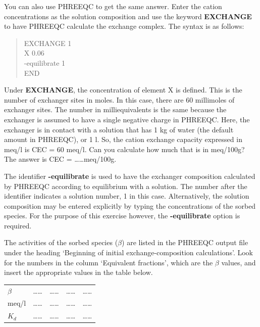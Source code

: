 You can also use PHREEQC to get the same answer. Enter the cation concentrations as the solution composition and use the keyword \textbf{EXCHANGE} to have PHREEQC calculate the exchange complex. The syntax is as follows:

\begin{quote}
EXCHANGE 1 \\
	X 0.06 \\
	-equilibrate 1 \\
END
\end{quote}

Under \textbf{EXCHANGE}, the concentration of element X is defined. This is the number of exchanger sites in moles. In this case, there are 60 millimoles of exchanger sites. The number in milliequivalents is the same because the exchanger is assumed to have a single negative charge in PHREEQC. Here, the exchanger is in contact with a solution that has 1 kg of water (the default amount in PHREEQC), or 1 l. So, the cation exchange capacity expressed in meq/l is CEC = 60 meq/l. Can you calculate how much that is in meq/100g? The answer is CEC = \ldots\ldots meq/100g.

The identifier \textbf{-equilibrate} is used to have the exchanger composition calculated by PHREEQC according to equilibrium with a solution. The number after the identifier indicates a solution number, 1 in this case. Alternatively, the solution composition may be entered explicitly by typing the concentrations of the sorbed species. For the purpose of this exercise however, the \textbf{-equilibrate} option is required.

The activities of the sorbed species ($\beta$) are listed in the PHREEQC output file under the heading `Beginning of initial exchange-composition calculations'. Look for the numbers in the column `Equivalent fractions', which are the $\beta$ values, and insert the appropriate values in the table below.

\begin{table}[hb]
\centering
\footnotesize
\begin{tabular}{lllll}
\toprule
 & \na	& \ka & \ca & \mg \\
\midrule
$\beta$ & \ldots\ldots & \ldots\ldots & \ldots\ldots & \ldots\ldots \\
meq/l   & \ldots\ldots & \ldots\ldots & \ldots\ldots & \ldots\ldots \\
$K_d$   & \ldots\ldots & \ldots\ldots & \ldots\ldots & \ldots\ldots \\
\bottomrule
\end{tabular}
\end{table}

